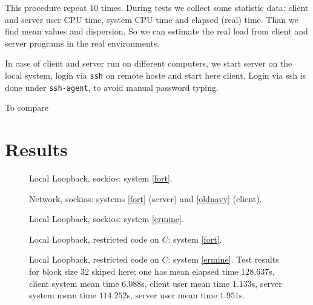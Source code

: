 \documentclass[a4paper]{article}
\begin{document}
This procedure repeat $10$ times. During tests we collect some statistic
data: client and server user CPU time, system CPU time and elapsed (real) time.
Than we find mean values and dispersion. So we can estimate the real
load from client and server programs in the real environments.

In case of client and server run on different computers, we start server on
the local system, login via \texttt{ssh} on remote hoste and start here client.
Login via ssh is done under \texttt{ssh-agent}, to avoid manual password typing.

To compare

\section{Results}

\begin{figure}
  \begin{center}
    
  \end{center}
  \caption{Local Loopback, sockios: system \ref{fort}.}
\end{figure}

\begin{figure}
  \begin{center}
    
  \end{center}
  \caption{Network, sockios:
           systems \ref{fort} (server) and \ref{oldnavy} (client).}
\end{figure}

\begin{figure}
  \begin{center}
    
  \end{center}
  \caption{Local Loopback, sockios: system \ref{ermine}.}
\end{figure}

\begin{figure}
  \begin{center}
    
  \end{center}
  \caption{Local Loopback, restricted code on $C$: system \ref{fort}.}
\end{figure}

\begin{figure}
  \begin{center}
    
  \end{center}
  \caption{Local Loopback, restricted code on $C$: system \ref{ermine}.
           Test results for block size $32$ skiped here; one has 
           mean elapsed time $128.637$s, client system mean 
           time $6.088$s, client user mean time $1.133$s, server system
           mean time $114.252$s, server user mean time $1.951$s.}
\end{figure}
\end{document}

